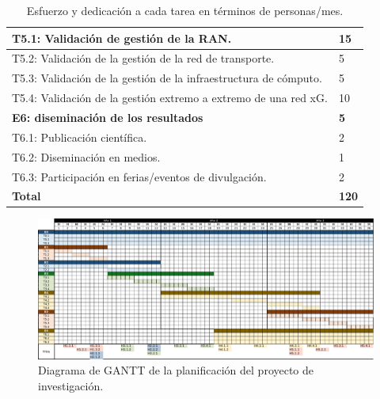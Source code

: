 \documentclass[xcolor=table,xcolor=x11names]{beamer}
\begin{document}
\begin{frame}{\subsecname}
\begin{table}
\begin{adjustbox}{width=.7\textwidth,center}
\begin{tabular}{ p{12cm} | p{2cm}  }
T5.1: Validación de gestión de la RAN. & 15 \\ \hline
T5.2: Validación de la gestión de la red de transporte. & 5 \\ \hline
T5.3:  Validación de la gestión de la infraestructura de cómputo. & 5 \\ \hline
T5.4:   Validación de la gestión extremo a extremo de una red xG. & 10 \\ \hline
 \rowcolor{upmblue!20}      \textbf{E6: diseminación de los resultados} & \textbf{5} \\ \hline 
T6.1: Publicación científica. & 2 \\ \hline
T6.2: Diseminación en medios. & 1 \\ \hline
T6.3: Participación en ferias/eventos de divulgación.  & 2 \\ \hline
 \rowcolor{upmblue!40}      \textbf{Total} & \textbf{120} \\ \bottomrule


\end{tabular}
\end{adjustbox}
\caption{Esfuerzo y dedicación a cada tarea en términos
de personas/mes.}
\label{tab:personas-mes}
\end{table}

\normalsize


\end{frame}






\begin{frame}{\subsecname}
    \begin{figure}
    \includegraphics[width=\textwidth]{figures/ganttPPL.pdf}
    \caption{Diagrama de GANTT de la planificación del
    proyecto de investigación.}
    \end{figure}
\end{frame}
\end{document}
